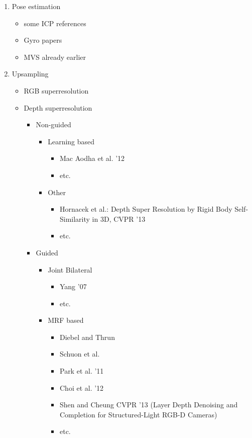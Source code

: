 \documentclass[12pt,a4paper]{article}
\begin{document}
\begin{enumerate}
\begin{itemize}
			
		\end{itemize}
			
 		\item Pose estimation
		\begin{itemize}
			\item some ICP references
			\item Gyro papers
			\item MVS already earlier
		\end{itemize}
		
		\item Upsampling
		\begin{itemize}
			\item RGB superresolution
			\item Depth superresolution
			\begin{itemize}
				\item Non-guided
				\begin{itemize}
					\item Learning based
						\begin{itemize}
							\item Mac Aodha et al. '12
							\item etc.
						\end{itemize}
					\item Other
					\begin{itemize}
						\item Hornacek et al.: Depth Super Resolution by Rigid Body Self-Similarity in 3D, CVPR '13
						\item etc.
					\end{itemize}
				\end{itemize}
				
				\item Guided
				\begin{itemize}
					\item Joint Bilateral
					\begin{itemize}
						\item Yang '07
						\item etc.
					\end{itemize}
					\item MRF based
					\begin{itemize}
						\item Diebel and Thrun
						\item Schuon et al.
						\item Park et al. '11
						\item Choi et al. '12
						\item Shen and Cheung CVPR '13 (Layer Depth Denoising and Completion for Structured-Light RGB-D Cameras)
						\item etc.
					\end{itemize}
					

\end{itemize}
\end{itemize}
\end{itemize}
\end{enumerate}
\end{document}
